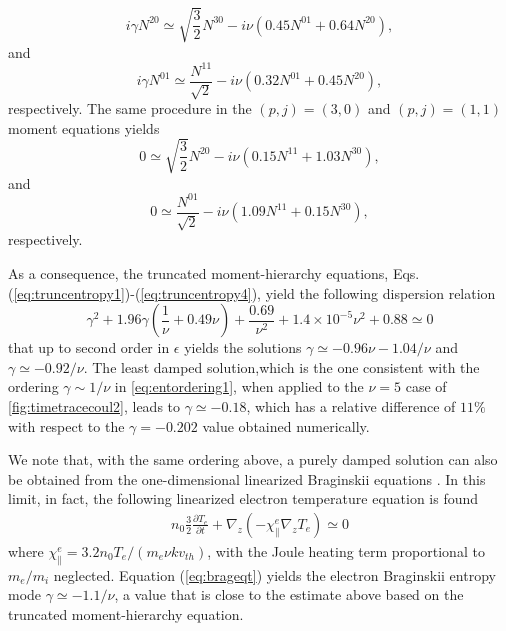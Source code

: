 %
\begin{equation}
	{i \gamma N^{20} \simeq \sqrt{\frac{3}{{2}}}N^{30}-i \nu(0.45N^{01}+0.64N^{20}),}
	\label{eq:truncentropy1}
\end{equation}
%
{and}
%
\begin{equation}
	{i \gamma N^{01} \simeq \frac{N^{11}}{\sqrt{2}}-i \nu(0.32N^{01}+0.45N^{20}),}
	\label{eq:truncentropy2}
\end{equation}
%
{respectively.}
%
{The same procedure in the $(p,j)=(3,0)$ and $(p,j)=(1,1)$ moment equations yields}
%
\begin{equation}
	{0 \simeq \sqrt{\frac{3}{{2}}}N^{20}-i \nu(0.15N^{11}+1.03N^{30}),}
	\label{eq:truncentropy3}
\end{equation}
%
{and}
%
\begin{equation}
	{0 \simeq \frac{N^{01}}{\sqrt{2}}-i \nu(1.09N^{11}+0.15N^{30}),}
	\label{eq:truncentropy4}
\end{equation}
%
{respectively.}

As a consequence, the truncated moment-hierarchy equations, Eqs. (\ref{eq:truncentropy1})-(\ref{eq:truncentropy4}), yield the following dispersion relation
%
\begin{equation}
    \gamma^2 + 1.96 \gamma \left(\frac{1}{\nu}+0.49 \nu\right)+\frac{0.69}{\nu^2}+1.4 \times 10^{-5} \nu^2+0.88\simeq0
\label{eq:disprelentropymode}
\end{equation}
%
{that up to second order in $\epsilon$ yields the solutions $\gamma \simeq -0.96 \nu-1.04/\nu$ and $\gamma \simeq -0.92/\nu$.}
%
{The least damped solution,which is the one consistent with the ordering $\gamma \sim 1/\nu$  in \cref{eq:entordering1}, when applied to the $\nu=5$ case of \cref{fig:timetracecoul2}, leads to $\gamma \simeq -0.18$, which has a relative difference of $11\%$ with respect to the $\gamma = -0.202$ value obtained numerically.
%
}

We note that, with the same ordering above, a purely damped solution can also be obtained from the one-dimensional linearized Braginskii equations \citep{Braginskii1965}.
%
In this limit, in fact, the following linearized electron temperature equation is found
%
\begin{align}
    n_0 \frac{3}{2}\frac{\partial T_e}{\partial t}+\nabla_z \left(- \chi_{\parallel}^e \nabla_z T_e \right) \simeq 0
\label{eq:brageqt}
\end{align}
%
where $\chi_{\parallel}^e = 3.2 n_0 T_e/(m_e \nu k v_{th})$, with the Joule heating term proportional to $m_e/m_i$ neglected.
%
Equation (\ref{eq:brageqt}) yields the electron Braginskii entropy mode $\gamma \simeq - 1.1/\nu$, a value that is close to the estimate {above} based on the truncated moment-hierarchy equation.

